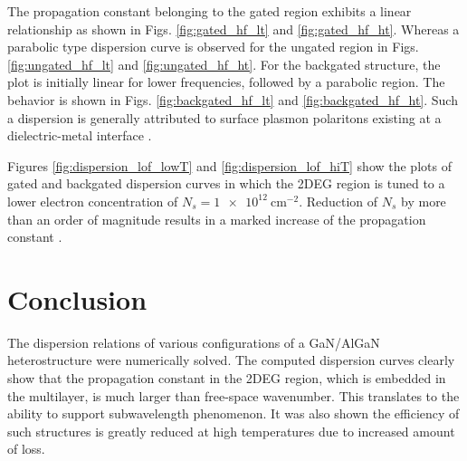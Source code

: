 The propagation constant belonging to the gated region exhibits a linear relationship \cite{Sydoruk2015,Ando1982} as shown in Figs. \ref{fig:gated_hf_lt} and \ref{fig:gated_hf_ht}. Whereas a parabolic type dispersion curve is observed for the ungated region in Figs. \ref{fig:ungated_hf_lt} and \ref{fig:ungated_hf_ht}. For the backgated structure, the plot is initially linear for lower frequencies, followed by a parabolic region. The behavior is shown in Figs. \ref{fig:backgated_hf_lt} and
\ref{fig:backgated_hf_ht}. Such a dispersion is generally attributed to surface plasmon polaritons existing at a dielectric-metal interface \cite{Yoon2014}.

Figures \ref{fig:dispersion_lof_lowT} and \ref{fig:dispersion_lof_hiT} show the plots of gated and backgated dispersion curves in which the 2DEG region is tuned to a lower electron concentration of $N_s = \SI{1e12}{\cm^{-2}}$. Reduction of $N_s$ by more than an order of magnitude results in a marked increase of the propagation constant \cite{Sydoruk2015a}.
\section{Conclusion}
%
The dispersion relations of various configurations of a GaN/AlGaN heterostructure were numerically solved. The computed dispersion curves clearly show that the propagation constant in the 2DEG region, which is embedded in the multilayer, is much larger than free-space wavenumber. This translates to the ability to support subwavelength phenomenon. It was also shown the efficiency of such structures is greatly reduced at high temperatures due to increased amount of loss.

% 
% 
%
% 
